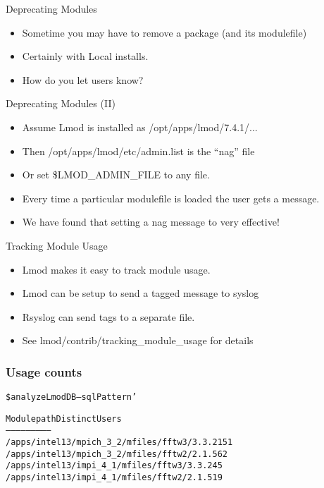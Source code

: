 \documentclass[dvipsnames,aspectratio=169]{beamer}
\begin{document}
\begin{frame}{Deprecating Modules}
  \begin{itemize}
    \item Sometime you may have to remove a package (and its
      modulefile)
    \item Certainly with Local installs.
    \item How do you let users know?
  \end{itemize}
\end{frame}

\begin{frame}{Deprecating Modules (II)}
  \begin{itemize}
    \item Assume Lmod is installed as /opt/apps/lmod/7.4.1/...
    \item Then /opt/apps/lmod/etc/admin.list is the ``nag'' file
    \item Or set \$LMOD\_ADMIN\_FILE to any file.
    \item Every time a particular modulefile is loaded the user gets a
      message.
    \item We have found that setting a nag message to very effective!
  \end{itemize}
\end{frame}

\begin{frame}{Tracking Module Usage}
  \begin{itemize}
    \item Lmod makes it easy to track module usage.
    \item Lmod can be setup to send a tagged message to syslog
    \item Rsyslog can send tags to a separate file.
    \item See lmod/contrib/tracking\_module\_usage for details
  \end{itemize}
\end{frame}

\begin{frame}[fragile]
    \frametitle{Usage counts}
  {\small
    \begin{alltt}
\$ analyzeLmodDB --sqlPattern '%fftw%' --start '2015-01-01 --end '2015-02-01'  counts

  Module path                                Distinct Users
  -----------                                --------------  
  /apps/intel13/mpich\_3\_2/mfiles/fftw3/3.3.2             151
  /apps/intel13/mpich\_3\_2/mfiles/fftw2/2.1.5              62
  /apps/intel13/impi\_4\_1/mfiles/fftw3/3.3.2               45
  /apps/intel13/impi\_4\_1/mfiles/fftw2/2.1.5               19

    \end{alltt}
}
\end{frame}
\end{document}
